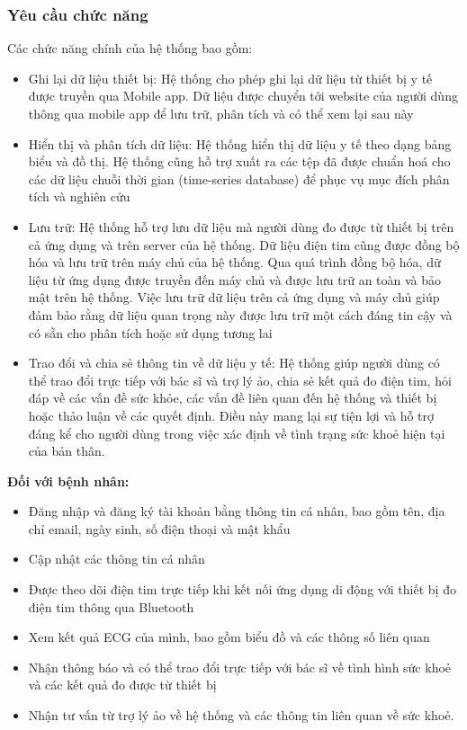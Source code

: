 \subsubsection{Yêu cầu chức năng}
Các chức năng chính của hệ thống bao gồm:
\begin{adjustwidth}{1.5em}{}
  \begin{itemize}
      \item Ghi lại dữ liệu thiết bị: Hệ thống cho phép ghi lại dữ liệu từ thiết bị y tế được truyền qua Mobile app. Dữ liệu được chuyển tới website của người dùng thông qua mobile app để lưu trữ, phân tích và có thể xem lại sau này
      \item Hiển thị và phân tích dữ liệu: Hệ thống hiển thị dữ liệu y tế theo dạng bảng biểu và đồ thị. Hệ thống cũng hỗ trợ xuất ra các tệp đã được chuẩn hoá cho các dữ liệu chuỗi thời gian (time-series database) để phục vụ mục đích phân tích và nghiên cứu
      \item Lưu trữ: Hệ thống hỗ trợ lưu dữ liệu mà người dùng đo được từ thiết bị trên cả ứng dụng và trên server của hệ thống. Dữ liệu điện tim cũng được đồng bộ hóa và lưu trữ trên máy chủ của hệ thống. Qua quá trình đồng bộ hóa, dữ liệu từ ứng dụng được truyền đến máy chủ và được lưu trữ an toàn và bảo mật trên hệ thống. Việc lưu trữ dữ liệu trên cả ứng dụng và máy chủ giúp đảm bảo rằng dữ liệu quan trọng này được lưu trữ một cách đáng tin cậy và có sẵn cho phân tích hoặc sử dụng tương lai
      \item Trao đổi và chia sẻ thông tin về dữ liệu y tế: Hệ thống giúp người dùng có thể trao đổi trực tiếp với bác sĩ và trợ lý ảo, chia sẻ kết quả đo điện tim, hỏi đáp về các vấn đề sức khỏe, các vấn đề liên quan đến hệ thống và thiết bị hoặc thảo luận về các quyết định. Điều này mang lại sự tiện lợi và hỗ trợ đáng kể cho người dùng trong việc xác định về tình trạng sức khoẻ hiện tại của bản thân.
      

  \end{itemize}
\end{adjustwidth}
\textbf{Đối với bệnh nhân:}
\begin{adjustwidth}{1.5em}{}
\begin{itemize}
    \item Đăng nhập và đăng ký tài khoản bằng thông tin cá nhân, bao gồm tên, địa chỉ email, ngày sinh, số điện thoại và mật khẩu
    \item Cập nhật các thông tin cá nhân
    \item Được theo dõi điện tim trực tiếp khi kết nối ứng dụng di động với thiết bị đo điện tim thông qua Bluetooth
    \item Xem kết quả ECG của mình, bao gồm biểu đồ và các thông số liên quan
    \item Nhận thông báo và có thể trao đổi trực tiếp với bác sĩ về tình hình sức khoẻ và các kết quả đo được từ thiết bị
    \item Nhận tư vấn từ trợ lý ảo về hệ thống và các thông tin liên quan về sức khoẻ.
\end{itemize}
\end{adjustwidth}
